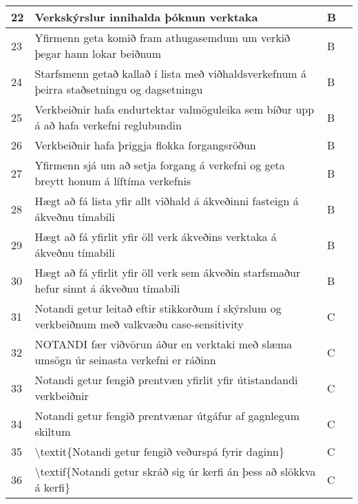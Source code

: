 \documentclass[a4paper]{article}
\begin{document}
\begin{tabular}{|l|p{10cm}|l|l|}
\hline
22& Verkskýrslur innihalda þóknun verktaka & B &\\
\hline
23& Yfirmenn geta komið fram athugasemdum um verkið þegar hann lokar beiðnum & B &\\
\hline
24& Starfsmenn getað kallað í lista með viðhaldsverkefnum á þeirra staðsetningu og dagsetningu & B &\\
\hline
25& Verkbeiðnir hafa endurtektar valmöguleika sem bíður upp á að hafa verkefni reglubundin & B &\\
\hline
26& Verkbeiðnir hafa þriggja flokka forgangsröðun & B &\\
\hline
27& Yfirmenn sjá um að setja forgang á verkefni og geta breytt honum á líftíma verkefnis  & B &\\
\hline
28& Hægt að fá lista yfir allt viðhald á ákveðinni fasteign á ákveðnu tímabili  & B &\\
\hline
29& Hægt að fá yfirlit yfir öll verk ákveðins verktaka á ákveðnu tímabili  & B &\\
\hline
30& Hægt að fá yfirlit yfir öll verk sem ákveðin starfsmaður hefur sinnt á ákveðnu tímabili  & B &\\
\hline
31& Notandi getur leitað eftir stikkorðum í skýrslum og verkbeiðnum með valkvæðu case-sensitivity& C &\\
\hline
32& NOTANDI fær viðvörun áður en verktaki með slæma umsögn úr seinasta verkefni er ráðinn & C &\\
\hline
33& Notandi getur fengið prentvæn yfirlit yfir útistandandi verkbeiðnir & C &\\
\hline
34& Notandi getur fengið prentvænar útgáfur af gagnlegum skiltum & C &\\
\hline
35& \textbackslash{}textit\{Notandi getur fengið veðurspá fyrir daginn\} &C &\\
\hline
36& \textbackslash{}textif\{Notandi getur skráð sig úr kerfi án þess að slökkva á kerfi\} & C &\\
\hline
\end{tabular}
\end{document}
